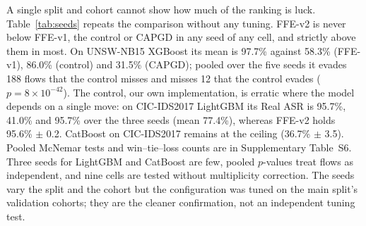 A single split and cohort cannot show how much of the ranking is luck. Table~\ref{tab:seeds} repeats the comparison without any tuning. FFE-v2 is never below FFE-v1, the control or CAPGD in any seed of any cell, and strictly above them in most. On UNSW-NB15 XGBoost its mean is 97.7\% against 58.3\% (FFE-v1), 86.0\% (control) and 31.5\% (CAPGD); pooled over the five seeds it evades 188 flows that the control misses and misses 12 that the control evades ($p=8\times10^{-42}$). The control, our own implementation, is erratic where the model depends on a single move: on CIC-IDS2017 LightGBM its Real ASR is 95.7\%, 41.0\% and 95.7\% over the three seeds (mean 77.4\%), whereas FFE-v2 holds 95.6\% $\pm$ 0.2. CatBoost on CIC-IDS2017 remains at the ceiling (36.7\% $\pm$ 3.5). Pooled McNemar tests and win--tie--loss counts are in Supplementary Table~S6. Three seeds for LightGBM and CatBoost are few, pooled $p$-values treat flows as independent, and nine cells are tested without multiplicity correction. The seeds vary the split and the cohort but the configuration was tuned on the main split's validation cohorts; they are the cleaner confirmation, not an independent tuning test.

